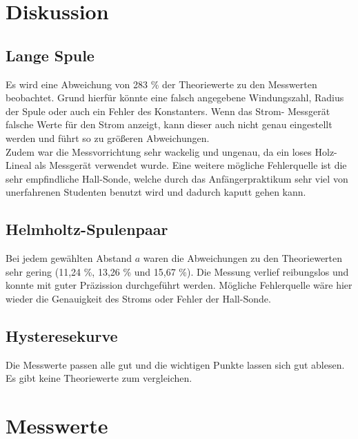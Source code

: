 \section{Diskussion}
\label{sec:Diskussion}

\subsection{Lange Spule}

Es wird eine Abweichung von 283 \% der Theoriewerte zu den Messwerten beobachtet. Grund hierfür könnte
eine falsch angegebene Windungszahl, Radius der Spule oder auch ein Fehler des Konstanters. Wenn das Strom-
Messgerät falsche Werte für den Strom anzeigt, kann dieser auch nicht genau eingestellt werden und führt
so zu größeren Abweichungen.\\
Zudem war die Messvorrichtung sehr wackelig und ungenau, da ein loses Holz-Lineal als Messgerät verwendet wurde.
Eine weitere mögliche Fehlerquelle ist die sehr empfindliche Hall-Sonde, welche durch das Anfängerpraktikum sehr
viel von unerfahrenen Studenten benutzt wird und dadurch kaputt gehen kann.

\subsection{Helmholtz-Spulenpaar}

Bei jedem gewählten Abstand $a$ waren die Abweichungen zu den Theoriewerten sehr gering (11,24 \%, 13,26 \% und 15,67 \%).
Die Messung verlief reibungslos und konnte mit guter Präzission durchgeführt werden. Mögliche Fehlerquelle
wäre hier wieder die Genauigkeit des Stroms oder Fehler der Hall-Sonde.

\subsection{Hysteresekurve}

Die Messwerte passen alle gut und die wichtigen Punkte lassen sich gut ablesen. Es gibt keine Theoriewerte zum
vergleichen.

\section{Messwerte}

\label{sec:Messwerte}

